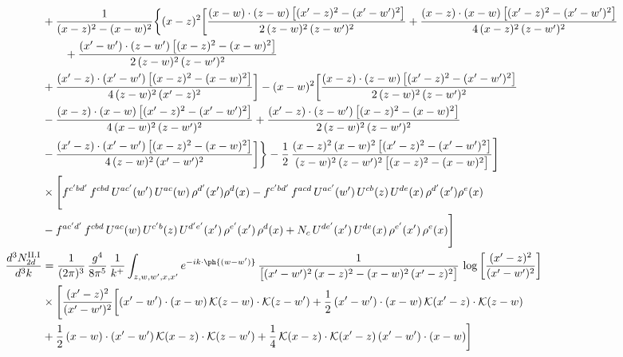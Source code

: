 \begin{align}
&+\frac{1}{(x-z)^{2}-(x-w)^{2}}\bigg\{(x-z)^{2}\bigg[\frac{(x-w)\cdot(z-w)\,\big[(x^{\prime}-z)^{2}-(x^{\prime}-w^{\prime})^{2}\big]}{2\,(z-w)^{2}\,(z-w^{\prime})^{2}}+\frac{(x-z)\cdot(x-w)\,\big[(x^{\prime}-z)^{2}-(x^{\prime}-w^{\prime})^{2}\big]}{4\,(x-z)^{2}\,(z-w^{\prime})^{2}}\notag\\ &\qquad+\frac{(x^{\prime}-w^{\prime})\cdot(z-w^{\prime})\,\big[(x-z)^{2}-(x-w)^{2}\big]}{2\,(z-w)^{2}\,(z-w^{\prime})^{2}}\notag \\ & +\frac{(x^{\prime}-z)\cdot(x^{\prime}-w^{\prime})\,\big[(x-z)^{2}-(x-w)^{2}\big]}{4\,(z-w)^{2}\,(x^{\prime}-z)^{2}}\bigg]-(x-w)^{2}\bigg[\frac{(x-z)\cdot(z-w)\,\big[(x^{\prime}-z)^{2}-(x^{\prime}-w^{\prime})^{2}\big]}{2\,(z-w)^{2}\,(z-w^{\prime})^{2}}\notag \\ & -\frac{(x-z)\cdot(x-w)\,\big[(x^{\prime}-z)^{2}-(x^{\prime}-w^{\prime})^{2}\big]}{4\,(x-w)^{2}\,(z-w^{\prime})^{2}}+\frac{(x^{\prime}-z)\cdot(z-w^{\prime})\,\big[(x-z)^{2}-(x-w)^{2}\big]}{2\,(z-w)^{2}\,(z-w^{\prime})^{2}}\notag \\ & -\frac{(x^{\prime}-z)\cdot(x^{\prime}-w^{\prime})\,\big[(x-z)^{2}-(x-w)^{2}\big]}{4\,(z-w)^{2}\,(x^{\prime}-w^{\prime})^{2}}\bigg]\bigg\}-\frac{1}{2}\,\frac{(x-z)^{2}\,(x-w)^{2}\,\big[(x^{\prime}-z)^{2}-(x^{\prime}-w^{\prime})^{2}\big]}{(z-w)^{2}\,(z-w^{\prime})^{2}\,\big[(x-z)^{2}-(x-w)^{2}\big]}\Bigg]\notag\\
&\times\Bigg[f^{c^{\prime}bd^{\prime}}\,f^{cbd}\, U^{ac^{\prime}}(w^{\prime})\,U^{ac}(w)\,\rho^{d^{\prime}}(x^{\prime})\rho^{d}(x)- f^{c^{\prime}bd^{\prime}}\,f^{acd}\,U^{ac^{\prime}}(w^{\prime})\,U^{cb}(z)\,U^{de}(x)\,\rho^{d^{\prime}}(x^{\prime})\rho^{e}(x) \notag \\ & -f^{ac^{\prime}d^{\prime}}\,f^{cbd}\,U^{ac}(w)\,U^{c^{\prime}b}(z)\,U^{d^{\prime}e^{\prime}}(x^{\prime})\,\rho^{e^{\prime}}(x^{\prime})\,\rho^{d}(x) +N_{c}\,U^{de^{\prime}}(x^{\prime})\,U^{de}(x)\,\rho^{e^{\prime}}(x^{\prime})\,\rho^{e}(x)\Bigg]\label{eq:B-II2c}\\
\frac{d^{3}N^{\rm II.I}_{2d}}{d^{3}k}&= \frac{1}{(2\pi)^{3}}\,\frac{g^{4}}{8\pi^{5}}\,\frac{1}{k^{+}}\int_{z,w,w^{\prime},x,x^{\prime}}e^{-ik\cdot\ph{(w-w^{\prime})}}\,\frac{1}{\big[(x^{\prime}-w^{\prime})^{2}\,(x-z)^{2}-(x-w)^{2}\,(x^{\prime}-z)^{2}\big]}\,\log\left[\frac{(x^{\prime}-z)^{2}}{(x^{\prime}-w^{\prime})^{2}}\right]\notag\\
&\times\Bigg[\frac{(x^{\prime}-z)^{2}}{(x^{\prime}-w^{\prime})^{2}}\bigg[(x^{\prime}-w^{\prime})\cdot(x-w)\,\mathcal{K}(z-w)\cdot\mathcal{K}(z-w^{\prime})+\frac{1}{2}\,(x^{\prime}-w^{\prime})\cdot(x-w)\,\mathcal{K}(x^{\prime}-z)\cdot\mathcal{K}(z-w)\notag \\ & +\frac{1}{2}\,(x-w)\cdot(x^{\prime}-w^{\prime})\,\mathcal{K}(x-z)\cdot\mathcal{K}(z-w^{\prime})+\frac{1}{4}\,\mathcal{K}(x-z)\cdot\mathcal{K}(x^{\prime}-z)\,(x^{\prime}-w^{\prime})\cdot(x-w)\bigg]\notag\\

\end{align}
